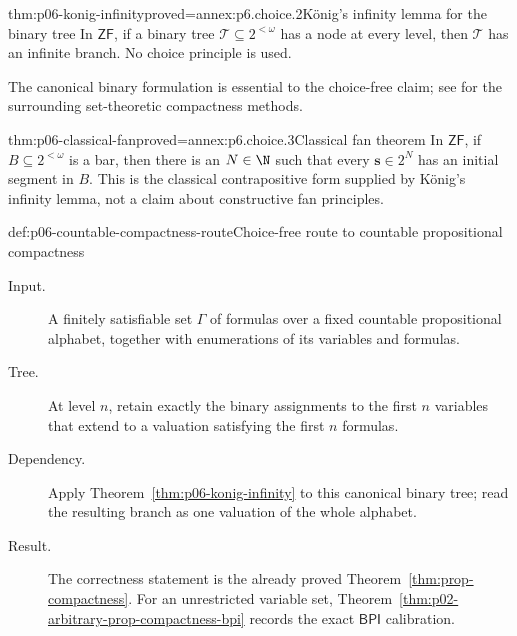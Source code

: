 \begin{hbtheorem}{thm:p06-konig-infinity}{proved=annex:p6.choice.2}{K\"onig's infinity lemma for the binary tree}
In \(\mathsf{ZF}\), if a binary tree \(\mathcal T\subseteq2^{<\omega}\) has a
node at every level, then \(\mathcal T\) has an infinite branch.  No choice
principle is used.
\end{hbtheorem}
The canonical binary formulation is essential to the choice-free claim; see
\cite{Jech2003} for the surrounding set-theoretic compactness methods.

\begin{hbcorollary}{thm:p06-classical-fan}{proved=annex:p6.choice.3}{Classical fan theorem}
In \(\mathsf{ZF}\), if \(B\subseteq2^{<\omega}\) is a bar, then there is an
\(N\in\N\) such that every \(\mathbf s\in2^N\) has an initial segment in \(B\).
This is the classical contrapositive form supplied by K\"onig's infinity
lemma, not a claim about constructive fan principles.
\end{hbcorollary}

\begin{hbmethod}{def:p06-countable-compactness-route}{Choice-free route to countable propositional compactness}
\begin{description}
  \item[Input.] A finitely satisfiable set \(\Gamma\) of formulas over a fixed
        countable propositional alphabet, together with enumerations of its
        variables and formulas.
  \item[Tree.] At level \(n\), retain exactly the binary assignments to the
        first \(n\) variables that extend to a valuation satisfying the first
        \(n\) formulas.
  \item[Dependency.] Apply Theorem~\ref{thm:p06-konig-infinity} to this
        canonical binary tree; read the resulting branch as one valuation of
        the whole alphabet.
  \item[Result.] The correctness statement is the already proved
        Theorem~\ref{thm:prop-compactness}.  For an unrestricted variable set,
        Theorem~\ref{thm:p02-arbitrary-prop-compactness-bpi} records the exact
        \(\mathsf{BPI}\) calibration.
\end{description}
\end{hbmethod}
